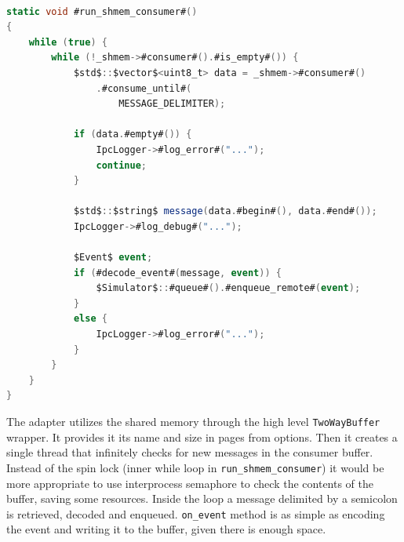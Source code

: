 \begin{lstlisting}[language=csharp, caption={\texttt{run\_shmem\_consumer} function}]

static void #run_shmem_consumer#()
{
    while (true) {
        while (!_shmem->#consumer#().#is_empty#()) {
            $std$::$vector$<uint8_t> data = _shmem->#consumer#()
                .#consume_until#(
                    MESSAGE_DELIMITER);

            if (data.#empty#()) {
                IpcLogger->#log_error#("...");
                continue;
            }

            $std$::$string$ message(data.#begin#(), data.#end#());
            IpcLogger->#log_debug#("...");

            $Event$ event;
            if (#decode_event#(message, event)) {
                $Simulator$::#queue#().#enqueue_remote#(event);
            }
            else {
                IpcLogger->#log_error#("...");
            }
        }
    }
}
\end{lstlisting}

The adapter utilizes the shared memory through the high level \texttt{TwoWayBuffer} wrapper. It provides it its name and size in pages from options. Then it creates a single thread that infinitely checks for new messages in the consumer buffer. Instead of the spin lock (inner while loop in \texttt{run\_shmem\_consumer}) it would be more appropriate to use interprocess semaphore to check the contents of the buffer, saving some resources. Inside the loop a message delimited by a semicolon is retrieved, decoded and enqueued. \texttt{on\_event} method is as simple as encoding the event and writing it to the buffer, given there is enough space.